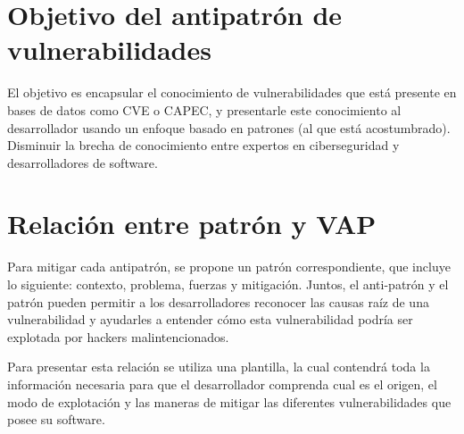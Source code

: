 \section{Objetivo del antipatrón de vulnerabilidades}
El objetivo es encapsular el conocimiento de vulnerabilidades que está presente en bases de datos como CVE o CAPEC, y presentarle este conocimiento al desarrollador usando un enfoque basado en patrones (al que está acostumbrado).
Disminuir la brecha de conocimiento entre expertos en ciberseguridad y desarrolladores de software.


\section{Relación entre patrón y VAP}
Para mitigar cada antipatrón, se propone un patrón correspondiente, que incluye lo siguiente: contexto, problema, fuerzas y mitigación. Juntos, el anti-patrón y el patrón pueden permitir a los desarrolladores reconocer las causas raíz de una vulnerabilidad y ayudarles a entender cómo esta vulnerabilidad podría ser explotada por hackers malintencionados.


Para presentar esta relación se utiliza una plantilla, la cual contendrá toda la información necesaria para que el desarrollador comprenda cual es el origen, el modo de explotación y las maneras de mitigar las diferentes vulnerabilidades que posee su software.